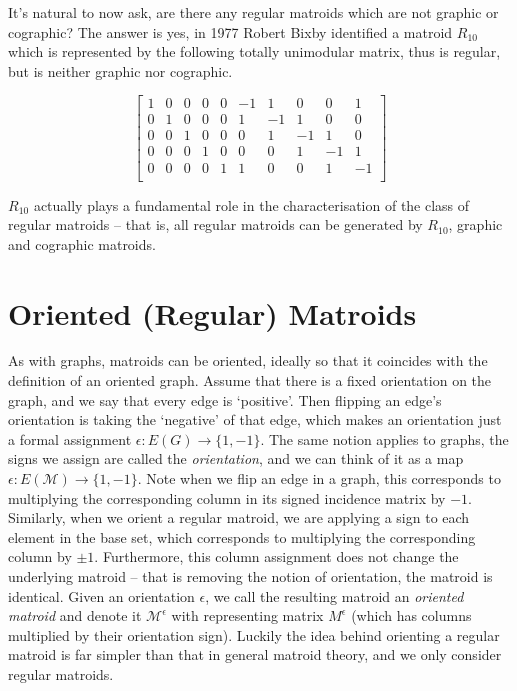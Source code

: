 \documentclass[12pt]{report}
\theoremstyle{definition}
\def\calM{\mathcal M}
\theoremstyle{upright}
\begin{document}
It's natural to now ask, are there any regular matroids which are not graphic or cographic?
The answer is yes, in 1977 Robert Bixby \cite{bixby1977kuratowski} identified a matroid $R_{10}$ which is represented by the following totally unimodular matrix, thus is regular, but is neither graphic nor cographic.

\[\begin{bmatrix}
    1 & 0 & 0 & 0 & 0 & -1 & 1 & 0 & 0 & 1\\
    0 & 1 & 0 & 0 & 0 & 1 & -1 & 1 & 0 & 0\\
    0 & 0 & 1 & 0 & 0 & 0 & 1 & -1 & 1 & 0\\
    0 & 0 & 0 & 1 & 0 & 0 & 0 & 1 & -1 & 1\\
    0 & 0 & 0 & 0 & 1 & 1 & 0 & 0 & 1 & -1\\
\end{bmatrix}\]

$R_{10}$ actually plays a fundamental role in the characterisation of the class of regular matroids -- that is, all regular matroids can be generated by $R_{10}$, graphic and cographic matroids.

\section{Oriented (Regular) Matroids}
\label{sec:OrientedMatroids}

As with graphs, matroids can be oriented, ideally so that it coincides with the definition of an oriented graph.
Assume that there is a fixed orientation on the graph, and we say that every edge is `positive'.
Then flipping an edge's orientation is taking the `negative' of that edge, which makes an orientation just a formal assignment $\epsilon:E(G)\rightarrow\{1, -1\}$.
The same notion applies to graphs, the signs we assign are called the \textit{orientation}, and we can think of it as a map $\epsilon:E(\calM)\rightarrow\{1, -1\}$.
Note when we flip an edge in a graph, this corresponds to multiplying the corresponding column in its signed incidence matrix by $-1$.
Similarly, when we orient a regular matroid, we are applying a sign to each element in the base set, which corresponds to multiplying the corresponding column by $\pm1$.
Furthermore, this column assignment does not change the underlying matroid -- that is removing the notion of orientation, the matroid is identical.
Given an orientation $\epsilon$, we call the resulting matroid an \textit{oriented matroid} and denote it $\calM^\epsilon$ with representing matrix $M^\epsilon$ (which has columns multiplied by their orientation sign).
Luckily the idea behind orienting a regular matroid is far simpler than that in general matroid theory, and we only consider regular matroids.
\end{document}
